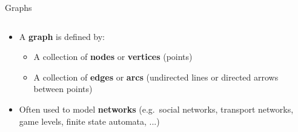 \begin{frame}{Graphs}
\begin{columns}
\begin{column}{0.68\textwidth}
\begin{itemize}
				\pause\item A \textbf{graph} is defined by:
					\begin{itemize}
						\pause\item A collection of \textbf{nodes} or \textbf{vertices} (points)
						\pause\item A collection of \textbf{edges} or \textbf{arcs} (undirected lines or directed arrows between points)
					\end{itemize}
				\pause\item Often used to model \textbf{networks} (e.g.\ social networks, transport networks, game levels, finite state automata, ...)
			\end{itemize}
		\end{column}
	\end{columns}
\end{frame}

